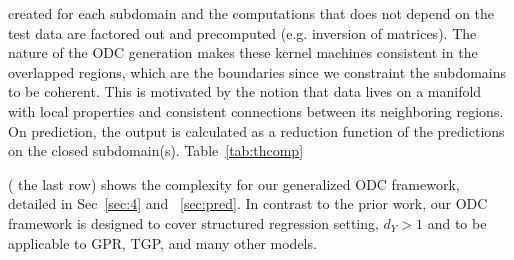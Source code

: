 {\begin{figure}
\end{figure}} created for each subdomain and the computations that does not depend on the test data are factored out and precomputed (e.g. inversion of matrices). The nature of the ODC generation makes these kernel machines consistent in the overlapped regions, which are the boundaries since we constraint the subdomains to be coherent. This is motivated by the notion that data lives on a manifold with local properties and consistent connections between its neighboring regions. On prediction, the output is calculated as a reduction function of the predictions on the closed subdomain(s). Table~\ref{tab:thcomp} ( the last row) shows the complexity for our generalized ODC framework, detailed in Sec~\ref{sec:4} and ~\ref{sec:pred}. In contrast to the prior work, our ODC framework is designed to cover structured regression setting, $d_Y>1$ and to be applicable to GPR, TGP, and many other models.

